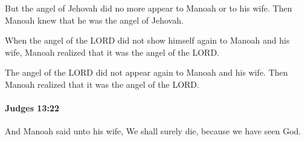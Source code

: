 			\begin{versebox}
					\item[BHS] 
					\item[ASV] But the angel of Jehovah did no more appear to Manoah or to his wife. Then Manoah knew that he was the angel of Jehovah.
					\item[NIV] When the angel of the LORD did not show himself again to Manoah and his wife, Manoah realized that it was the angel of the LORD.
					\item[NRSV] The angel of the LORD did not appear again to Manoah and his wife. Then Manoah realized that it was the angel of the LORD.
			\end{versebox}

		\paragraph{Judges 13:22} %
			\label{JUDGES-13-22}

			And Manoah said unto his wife, We shall surely die, because we have seen God.

